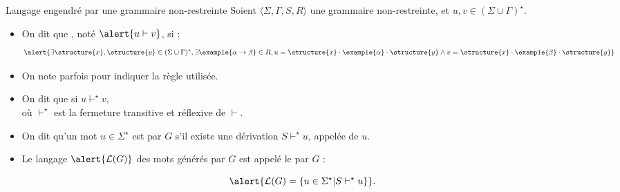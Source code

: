 
\begingroup

\begin{frame}{Langage engendré par une grammaire non-restreinte}
  Soient \alert{$\langle \Sigma, \Gamma, S, R \rangle$} une grammaire non-restreinte, et $u, v \in (\Sigma \cup \Gamma)^\star$. 
  \begin{itemize}
  \item On dit que , noté $\alert{u \vdash v}$, si :
    $$\alert{\exists \structure{x}, \structure{y} \in (\Sigma \cup \Gamma)^\star, \exists \example{\alpha \rightarrow \beta} \in R,
    u = \structure{x} \cdot \example{\alpha} \cdot \structure{y} \land v = \structure{x} \cdot \example{\beta} \cdot \structure{y}}$$

  \item On note parfois  pour indiquer la règle utilisée.

  \item On dit que  si \alert{$u \vdash^\star v$},\\
    où \alert{$\vdash^\star$ est la fermeture transitive et réflexive de $\vdash$}.

  \item On dit qu'un mot $u \in \Sigma^\star$ est  par $G$ s'il existe une dérivation $S \vdash^\star u$, appelée  de $u$. 
  \item Le langage $\alert{\mathcal{L}(G)}$ des mots générés par $G$ est appelé le  par $G$ :
  \end{itemize}
  $$\alert{\mathcal{L}(G) = \{u\in\Sigma^\star | S \vdash^\star u \}}.$$
\end{frame}

\endgroup
